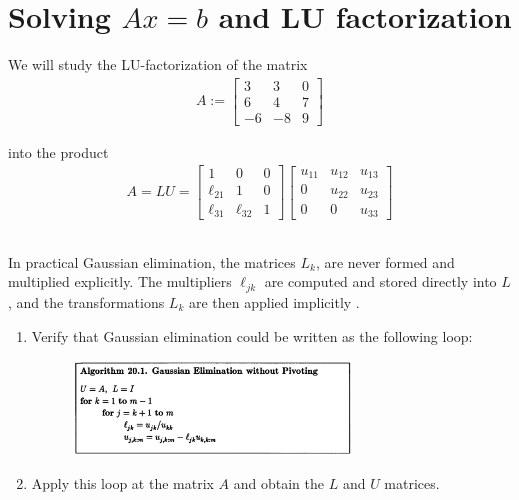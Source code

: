 \documentclass[11pt,letterpaper]{article}
\begin{document}
\section{Solving $Ax=b$ and LU factorization}
We will study the LU-factorization of the matrix
\begin{align*}
    A:=
  \begin{bmatrix}
    3  &   3   &    0\\
    6  &   4   &  7\\
    -6 &  -8   &   9
  \end{bmatrix}
\end{align*}

into the product
\begin{align*}
A = LU =
\begin{bmatrix}
1 & 0 & 0 \\
    \ell_{21} & 1 & 0\\
    \ell_{31} & \ell_{32} & 1
\end{bmatrix}
\begin{bmatrix}
    u_{11} & u_{12} & u_{13} \\
    0 & u_{22} & u_{23}\\
    0 & 0 & u_{33}
\end{bmatrix}
\end{align*}

\subsection{}
In practical Gaussian elimination, the matrices $L_k$, are never formed and multiplied explicitly. The multipliers $\ell_{jk}$ are computed and stored directly into $L$, and the transformations $L_k$ are then applied implicitly \cite[p.151]{TrefethenBau_97}.

\begin{enumerate}
    \item Verify that Gaussian elimination could be written as the following loop:
    \begin{figure}[H]
        \centering
        \includegraphics[width = 0.7\textwidth]{figs/TB97_Guass_wo_piv}
    \end{figure}
    \item Apply this loop at the matrix $A$ and obtain the $L$ and $U$ matrices.
\end{enumerate}
\end{document}
